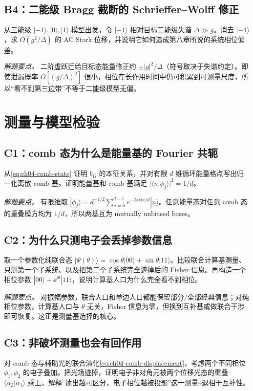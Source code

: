 \subsection*{B4：二能级 Bragg 截断的 Schrieffer--Wolff 修正}
从三能级 $|{-1}\rangle,|0\rangle,|1\rangle$ 模型出发，令 $|-1\rangle$ 相对目标二能级失谐 $\Delta\gg g$。消去 $|-1\rangle$，求 $O(g^2/\Delta)$ 的 AC Stark 位移，并说明它如何造成第八章所说的系统相位偏差。

\textit{解题要点。} 二阶虚跃迁给目标态能量修正约 $\pm |g|^2/\Delta$（符号取决于失谐约定）。即使泄漏概率 $O[(g/\Delta)^2]$ 很小，相位在长作用时间中仍可积累到可测量尺度，所以“看不到第三边带”不等于二能级模型无偏。

\section{测量与模型检验}
\subsection*{C1：comb 态为什么是能量基的 Fourier 共轭}
从\cref{eq:ch04-comb-state} 证明 $b_\Omega$ 的本征关系，并对有限 $d$ 维循环能量格点写出归一化离散 comb 基。证明能量基和 comb 基满足 $|\langle n|\phi_j\rangle|^2=1/d$。

\textit{解题要点。} 有限维取 $|\phi_j\rangle=d^{-1/2}\sum_{n=0}^{d-1}e^{-2\pi\ii jn/d}|n\rangle$。任意能量态对任意 comb 态的重叠模方均为 $1/d$，所以两基互为 mutually unbiased bases。

\subsection*{C2：为什么只测电子会丢掉参数信息}
取一个参数化纯联合态 $|\Psi(\theta)\rangle=\cos\theta|00\rangle+\sin\theta|11\rangle$。比较联合计算基测量、只测第一个子系统、以及把第二个子系统完全迹掉后的 Fisher 信息。再构造一个相位参数 $|00\rangle+\ee^{\ii\theta}|11\rangle$，说明计算基人口为什么完全看不到相位。

\textit{解题要点。} 对振幅参数，联合人口和单边人口都能保留部分/全部经典信息；对纯相位参数，计算基人口与 $\theta$ 无关，Fisher 信息为零，但换到互补基或做联合干涉即可恢复。这正是测量基选择的核心。

\subsection*{C3：非破坏测量也会有回作用}
对 comb 态与辅助光的联合演化\cref{eq:ch04-comb-displacement}，考虑两个不同相位 $\phi_1,\phi_2$ 的电子叠加。把光场迹掉，证明电子非对角元被两个位移光态的重叠 $\langle\alpha_2|\alpha_1\rangle$ 乘上。解释“读出越可区分，电子相位越被投影”这一测量--退相干互补性。

